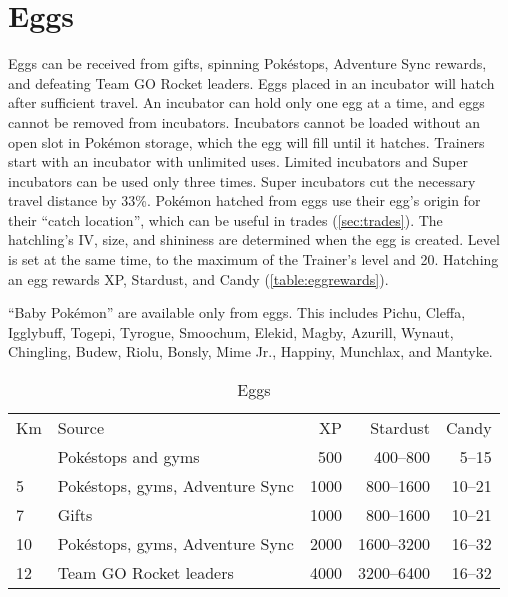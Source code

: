 \section{Eggs\label{sec:eggs}}
Eggs can be received from gifts, spinning Pokéstops, Adventure Sync rewards,
  and defeating Team GO Rocket leaders.
Eggs placed in an incubator will hatch after sufficient travel.
An incubator can hold only one egg at a time, and eggs cannot be removed from incubators.
Incubators cannot be loaded without an open slot in Pokémon storage, which the egg will fill
 until it hatches.
Trainers start with an incubator with unlimited uses.
Limited incubators and Super incubators can be used only three times.
Super incubators cut the necessary travel distance by 33\%.
Pokémon hatched from eggs use their egg's origin for their ``catch location'',
 which can be useful in trades (\autoref{sec:trades}).
The hatchling's IV, size, and shininess are determined when the egg is created.
Level is set at the same time, to the maximum of the Trainer's level and 20.
Hatching an egg rewards XP, Stardust, and Candy (\autoref{table:eggrewards}).
\begin{tipbox}[title=Baby Pokémon]
``Baby Pokémon'' are available only from eggs.
This includes Pichu, Cleffa, Igglybuff, Togepi, Tyrogue, Smoochum, Elekid, Magby,
 Azurill, Wynaut, Chingling, Budew, Riolu, Bonsly, Mime Jr., Happiny, Munchlax, and Mantyke.
\end{tipbox}
\begin{table}
\centering
\begin{tabular}{llrrr}
Km & Source & XP & Stardust & Candy\\
\Midrule
  2 & Pokéstops and gyms & 500 & 400--800 & 5--15\\
  5 & Pokéstops, gyms, Adventure Sync & 1000 & 800--1600 & 10--21\\
  7 & Gifts & 1000 & 800--1600 & 10--21\\
  10 & Pokéstops, gyms, Adventure Sync & 2000 & 1600--3200 & 16--32\\
  12 & Team GO Rocket leaders & 4000 & 3200--6400 & 16--32\\
\end{tabular}
  \caption{Eggs\label{table:eggrewards}}
\end{table}

